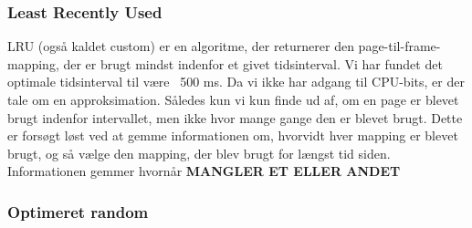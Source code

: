 	\subsubsection{Least Recently Used}
	LRU (også kaldet custom) er en algoritme, der returnerer den page-til-frame-mapping, der er brugt mindst indenfor et givet tidsinterval. Vi har fundet det optimale tidsinterval til være ~500 ms. Da vi ikke har adgang til CPU-bits, er der tale om en approksimation. Således kun vi kun finde ud af, om en page er blevet brugt indenfor intervallet, men ikke hvor mange gange den er blevet brugt. Dette er forsøgt løst ved at gemme informationen om, hvorvidt hver mapping er blevet brugt, og så vælge den mapping, der blev brugt for længst tid siden. Informationen gemmer hvornår \textbf{MANGLER ET ELLER ANDET}

	\subsubsection{Optimeret random}
	